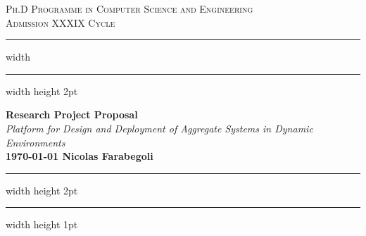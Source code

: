 \documentclass[12pt]{article}
\begin{document}
\begin{titlepage}
	\centering

	\textsc{\Large Ph.D Programme in Computer Science and Engineering}\\[0.5cm]
	\textsc{\Large Admission XXXIX Cycle}\\[0.6cm]

	\hrule width \hsize \kern 1mm \hrule width \hsize height 2pt
	\vspace{0.8cm}

	{\large \bfseries Research Project Proposal}\\[0.6cm]
	{\large \emph{Platform for Design and Deployment of Aggregate Systems in Dynamic Environments}}\\[0.6cm]

	{\bfseries{\monthyeardate\today} \hfill \bfseries{Nicolas Farabegoli}}\\[0.6cm]

	\hrule width \hsize height 2pt \kern 1mm \hrule width \hsize height 1pt
	\vspace{0.4cm}

	\begin{abstract}
		In recent years,
		the emergence of \ac{cps} has engendered a noteworthy surge in complexity and heterogeneity
		within the underlying infrastructure supporting these systems.
		Notably, the interplay between cloud, fog, and edge computing exemplifies the intricacy inherent in such systems.
		Modern collective adaptive applications like \ac{iot}, human enhanced by wearable devices,
		swarm robotics, smart cities,
		are designed to be executed on several devices and to be deployed in
		heterogeneous infrastructures, ranging from cloud servers to wearable devices.
		The availability of such a wide range of devices and infrastructures opens to
		better exploitation of the available resources and performance,
		but introduces complexity in the design and deployment of such applications.
		This research project proposes to produce a framework for the design and deployment of
		collective adaptive applications on heterogeneous infrastructures.
		Reconfiguration aspects will be considered,
		allowing the application to adapt to the changes in the infrastructure and external conditions.
		The framework will leverage machine learning techniques to manage the complex task of reconfiguration
		to opportunistically balance the performance and energy consumption.
		The framework will also offer modern approaches to make data avilable enabling data analysis;
		it becomes necessary because of the large amount of data produced by the \ac{iot} devices from extremely scattered data sources.
	\end{abstract}
\end{titlepage}
\end{document}
